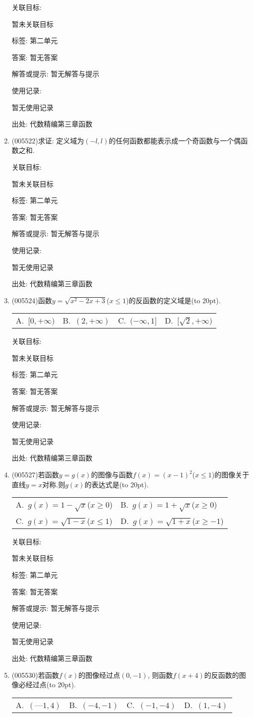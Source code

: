 \documentclass[10pt,a4paper]{article}
\newcommand{\bracket}[1]{(\hbox to #1pt{})}
\newcommand{\twoch}[4]{\par\begin{tabular}{p{.46\textwidth}p{.46\textwidth}}
A.~#1& B.~#2\\
C.~#3& D.~#4
\end{tabular}}
\newcommand{\fourch}[4]{\par\begin{tabular}{p{.23\textwidth}p{.23\textwidth}p{.23\textwidth}p{.23\textwidth}}
A.~#1 &B.~#2& C.~#3& D.~#4
\end{tabular}}
\begin{document}
\begin{enumerate}[1.]
关联目标:

暂未关联目标



标签: 第二单元

答案: 暂无答案

解答或提示: 暂无解答与提示

使用记录:

暂无使用记录


出处: 代数精编第三章函数
\item { (005522)}求证: 定义域为$(-l,l)$的任何函数都能表示成一个奇函数与一个偶函数之和.


关联目标:

暂未关联目标



标签: 第二单元

答案: 暂无答案

解答或提示: 暂无解答与提示

使用记录:

暂无使用记录


出处: 代数精编第三章函数
\item { (005524)}函数$y=\sqrt {x^2-2x+3}$($x\le 1$)的反函数的定义域是\bracket{20}.
\fourch{$[0,+\infty)$}{$(2,+\infty)$}{$(-\infty ,1]$}{$[\sqrt 2,+\infty)$}


关联目标:

暂未关联目标



标签: 第二单元

答案: 暂无答案

解答或提示: 暂无解答与提示

使用记录:

暂无使用记录


出处: 代数精编第三章函数
\item { (005527)}若函数$y=g(x)$的图像与函数$f(x)=(x-1)^2$($x\le 1$)的图像关于直线$y=x$对称.则$g(x)$的表达式是\bracket{20}.
\twoch{$g(x)=1-\sqrt x$($x\ge 0$)}{$g(x)=1+\sqrt x$($x\ge 0$)}{$g(x)=\sqrt {1-x}$($x\le 1$)}{$g(x)=\sqrt {1+x}$($x\ge -1$)}


关联目标:

暂未关联目标



标签: 第二单元

答案: 暂无答案

解答或提示: 暂无解答与提示

使用记录:

暂无使用记录


出处: 代数精编第三章函数
\item { (005530)}若函数$f(x)$的图像经过点$(0, -1)$, 则函数$f(x+4)$的反函数的图像必经过点\bracket{20}.
\fourch{$(—1,4)$}{$(-4,-1)$}{$(-1,-4)$}{$(1,-4)$}



\end{enumerate}
\end{document}
